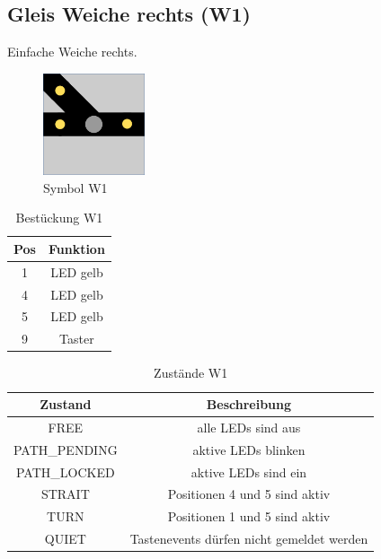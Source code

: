 \documentclass[10pt,a4paper]{article}
\begin{document}
\subsection{Gleis Weiche rechts (W1)}
Einfache Weiche rechts.
\begin{figure}[hbtp]
\centering
\includegraphics[width=3cm]{../folien/w1.png}
\caption{Symbol W1}
\end{figure}
\begin{table}[h!]
\centering
\begin{tabular}{c|c}
\textbf{Pos} & \textbf{Funktion} \\ \hline
1 & LED gelb \\
4 & LED gelb \\
5 & LED gelb \\
9 & Taster
\end{tabular}
\caption{Bestückung W1}
\end{table}
\begin{table}[h!]
\centering
\begin{tabular}{c|c}
\textbf{Zustand} & \textbf{Beschreibung} \\ \hline
FREE & alle LEDs sind aus \\
PATH\_PENDING & aktive LEDs blinken \\
PATH\_LOCKED & aktive LEDs sind ein \\
STRAIT & Positionen 4 und 5 sind aktiv \\
TURN & Positionen 1 und 5 sind aktiv\\
QUIET & Tastenevents dürfen nicht gemeldet werden
\end{tabular}
\caption{Zustände W1}
\end{table}

 \newpage
\end{document}
